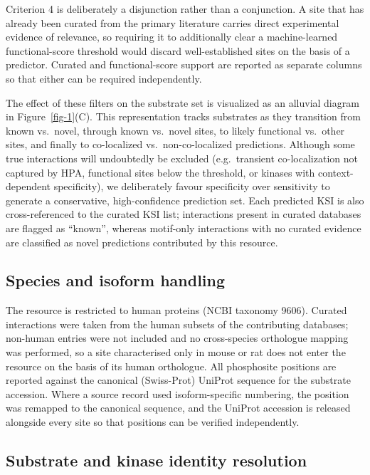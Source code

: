 \documentclass[
  number,
  preprint,
  onecolumn]{elsarticle}
\begin{document}
Criterion 4 is deliberately a disjunction rather than a conjunction. A
site that has already been curated from the primary literature carries
direct experimental evidence of relevance, so requiring it to
additionally clear a machine-learned functional-score threshold would
discard well-established sites on the basis of a predictor. Curated and
functional-score support are reported as separate columns so that either
can be required independently.

The effect of these filters on the substrate set is visualized as an
alluvial diagram in Figure~\ref{fig-1}(C). This representation tracks
substrates as they transition from known vs.~novel, through known
vs.~novel sites, to likely functional vs.~other sites, and finally to
co-localized vs.~non-co-localized predictions. Although some true
interactions will undoubtedly be excluded (e.g.~transient
co-localization not captured by HPA, functional sites below the
threshold, or kinases with context-dependent specificity), we
deliberately favour specificity over sensitivity to generate a
conservative, high-confidence prediction set. Each predicted KSI is also
cross-referenced to the curated KSI list; interactions present in
curated databases are flagged as ``known'', whereas motif-only
interactions with no curated evidence are classified as novel
predictions contributed by this resource.

\subsection{Species and isoform
handling}\label{species-and-isoform-handling}

The resource is restricted to human proteins (NCBI taxonomy 9606).
Curated interactions were taken from the human subsets of the
contributing databases; non-human entries were not included and no
cross-species orthologue mapping was performed, so a site characterised
only in mouse or rat does not enter the resource on the basis of its
human orthologue. All phosphosite positions are reported against the
canonical (Swiss-Prot) UniProt sequence for the substrate accession.
Where a source record used isoform-specific numbering, the position was
remapped to the canonical sequence, and the UniProt accession is
released alongside every site so that positions can be verified
independently.

\subsection{Substrate and kinase identity
resolution}\label{substrate-and-kinase-identity-resolution}
\end{document}
